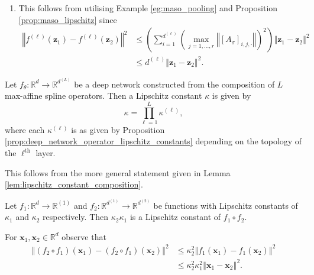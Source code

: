 \begin{tproof}
\begin{enumerate}
\begin{align*}
        \end{align*}
        \item This follows from utilising Example \ref{eg:maso_pooling} and Proposition \ref{prop:maso_lipschitz} since
        \begin{align*}
            \left\Vert f^{(\ell)}\left(\mathbf{z}_1\right)-f^{(\ell)}\left(\mathbf{z}_2\right)\right\Vert^2&\leq\left(\sum_{i=1}^{d^{(\ell)}}\left(\max_{j=1,\dots,r}\left\Vert\left[A_{\sigma}\right]_{i,j,\cdot}\right\Vert\right)^2\right)\left\Vert\mathbf{z}_1-\mathbf{z}_2\right\Vert^2\\&\leq d^{(\ell)}\left\Vert\mathbf{z}_1-\mathbf{z}_2\right\Vert^2.
        \end{align*}
    \end{enumerate}
\end{tproof}

\begin{proposition}
    Let $f_{\theta}:\mathbb{R}^d\to\mathbb{R}^{d^{(L)}}$ be a deep network constructed from the composition of $L$ max-affine spline operators. Then a Lipschitz constant $\kappa$ is given by $$\kappa=\prod_{\ell=1}^L\kappa^{(\ell)},$$where each $\kappa^{(\ell)}$ is as given by Proposition \ref{prop:deep_network_operator_lipschitz_constants} depending on the topology of the $\ell^\text{th}$ layer.
\end{proposition}

\begin{tproof}
    This follows from the more general statement given in Lemma \ref{lem:lipschitz_constant_composition}.

    \begin{plemma}\label{lem:lipschitz_constant_composition}
        Let $f_1:\mathbb{R}^d\to\mathbb{R}^{(1)}$ and $f_2:\mathbb{R}^{d^{(1)}}\to\mathbb{R}^{d^{(2)}}$ be functions with Lipschitz constants of $\kappa_1$ and $\kappa_2$ respectively. Then $\kappa_2\kappa_1$ is a Lipschitz constant of $f_1\circ f_2$.
    \end{plemma}

    \begin{pproof}
        For $\mathbf{x}_1,\mathbf{x}_2\in\mathbb{R}^d$ observe that
        \begin{align*}
            \left\Vert\left(f_2\circ f_1\right)\left(\mathbf{x}_1\right)-\left(f_2\circ f_1\right)\left(\mathbf{x}_2\right)\right\Vert^2&\leq\kappa_2^2\left\Vert f_1\left(\mathbf{x}_1\right)-f_1\left(\mathbf{x}_2\right)\right\Vert^2\\&\leq\kappa_2^2\kappa_1^2\left\Vert\mathbf{x}_1-\mathbf{x}_2\right\Vert^2.
        \end{align*}
    \end{pproof}
\end{tproof}

